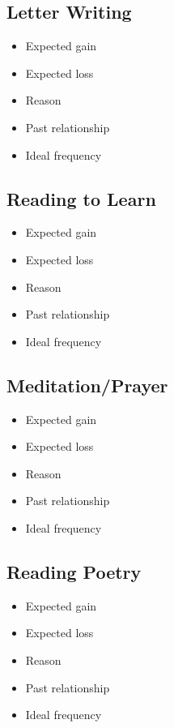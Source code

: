 \documentclass[12pt]{article}
\renewcommand{\,}{\textsuperscript{,}}
\begin{document}
\subsection{Letter Writing}
\begin{itemize}
    \item Expected gain
    \item Expected loss
    \item Reason
    \item Past relationship
    \item Ideal frequency

\end{itemize}
\subsection{Reading to Learn}
\begin{itemize}
    \item Expected gain
    \item Expected loss
    \item Reason
    \item Past relationship
    \item Ideal frequency

\end{itemize}

\subsection{Meditation/Prayer}
\begin{itemize}
    \item Expected gain
    \item Expected loss
    \item Reason
    \item Past relationship
    \item Ideal frequency
\end{itemize}

\subsection{Reading Poetry}
\begin{itemize}
    \item Expected gain
    \item Expected loss
    \item Reason
    \item Past relationship
    \item Ideal frequency

\end{itemize}
\end{document}
